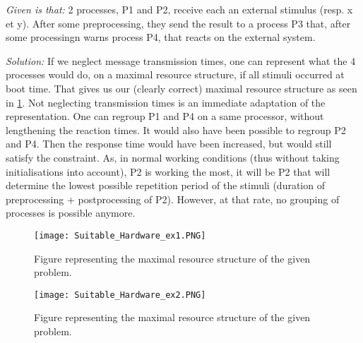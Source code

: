 \documentclass[../main.tex]{subfiles}
\begin{document}
\begin{exmp}
\emph{Given is that:} 2 processes, P1 and P2, receive each an external stimulus (resp. x et y). After some preprocessing, they send the result to a process P3 that, after some processingn warns process P4, that reacts on the external system. 

\emph{Solution:} If we neglect message transmission times, one can represent what the 4 processes would do, on a maximal resource structure, if all stimuli occurred at boot time.
That gives us our (clearly correct) maximal resource structure as seen in \ref{f:sh_ex1}.
Not neglecting transmission times is an immediate adaptation of the representation. One can regroup P1 and P4 on a same processor, without lengthening the reaction times. It would also have been possible to regroup P2 and P4. Then the response time would have been increased, but would still satisfy the constraint.
As, in normal working conditions (thus without taking initialisations into account), P2 is working the most, it will be P2 that will determine the lowest possible repetition period of the stimuli (duration of preprocessing + postprocessing of P2). However, at that rate, no grouping of processes is possible anymore.

\begin{figure}[H]
	\texttt{[image: Suitable\_Hardware\_ex1.PNG]}
	\caption{Figure representing the maximal resource structure of the given problem.}
	\label{f:sh_ex1}
\end{figure}

\begin{figure}[H]
	\texttt{[image: Suitable\_Hardware\_ex2.PNG]}
	\caption{Figure representing the maximal resource structure of the given problem.}
	\label{f:sh_ex2}
\end{figure}
\end{exmp}
\end{document}
